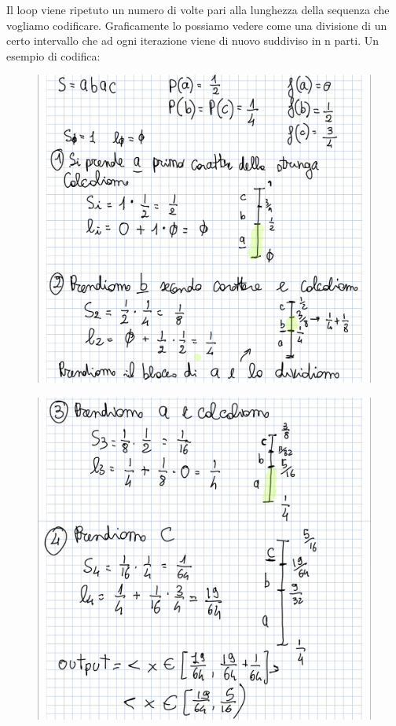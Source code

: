 \documentclass[14pt]{extreport}
\begin{document}
Il loop viene ripetuto un numero di volte pari alla lunghezza della sequenza che vogliamo codificare.
Graficamente lo possiamo vedere come una divisione di un certo intervallo che ad ogni iterazione viene di nuovo suddiviso in n parti.
Un esempio di codifica:

\begin{figure}[H]
\centering
  \includegraphics[width=\linewidth]{IMG_0175.jpg}
\end{figure}

\begin{figure}[H]
\centering
  \includegraphics[width=\linewidth]{IMG_0176.jpg}
\end{figure}
\end{document}
